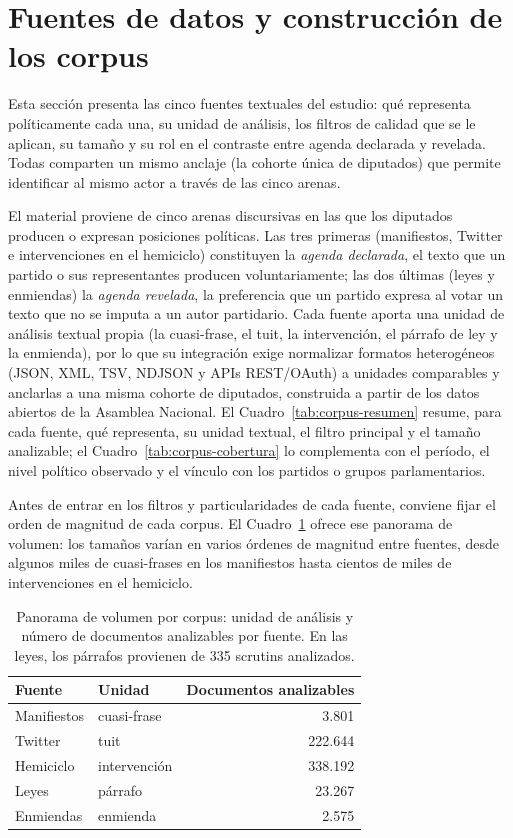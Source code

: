 \section{Fuentes de datos y construcción de los corpus}
\label{sec:fuentes}

Esta sección presenta las cinco fuentes textuales del estudio: qué representa
políticamente cada una, su unidad de análisis, los filtros de calidad que se le
aplican, su tamaño y su rol en el contraste entre agenda declarada y revelada.
Todas comparten un mismo anclaje (la cohorte única de diputados) que permite
identificar al mismo actor a través de las cinco arenas.

El material proviene de cinco arenas discursivas en las que los diputados
producen o expresan posiciones políticas. Las tres primeras (manifiestos,
Twitter e intervenciones en el hemiciclo) constituyen la \emph{agenda
declarada}, el texto que un partido o sus representantes producen voluntariamente;
las dos últimas (leyes y enmiendas) la \emph{agenda revelada}, la preferencia
que un partido expresa al votar un texto que no se imputa a un autor partidario.
Cada fuente aporta una unidad de análisis textual propia (la cuasi-frase, el
tuit, la intervención, el párrafo de ley y la enmienda), por lo que su
integración exige normalizar formatos heterogéneos (JSON, XML, TSV, NDJSON y
APIs REST/OAuth) a unidades comparables y anclarlas a una misma cohorte de
diputados, construida a partir de los datos abiertos de la Asamblea Nacional. El
Cuadro~\ref{tab:corpus-resumen} resume, para cada fuente, qué representa, su
unidad textual, el filtro principal y el tamaño analizable; el
Cuadro~\ref{tab:corpus-cobertura} lo complementa con el período, el nivel
político observado y el vínculo con los partidos o grupos parlamentarios.

Antes de entrar en los filtros y particularidades de cada fuente, conviene fijar
el orden de magnitud de cada corpus. El Cuadro~\ref{tab:corpus-volumen} ofrece ese
panorama de volumen: los tamaños varían en varios órdenes de magnitud entre
fuentes, desde algunos miles de cuasi-frases en los manifiestos hasta cientos de
miles de intervenciones en el hemiciclo.

\begin{table}[H]
\centering
\caption{Panorama de volumen por corpus: unidad de análisis y número de documentos
analizables por fuente. En las leyes, los párrafos provienen de 335 scrutins
analizados.}
\label{tab:corpus-volumen}
\small
\begin{tabular}{@{}llr@{}}
\toprule
\textbf{Fuente} & \textbf{Unidad} & \textbf{Documentos analizables} \\
\midrule
Manifiestos & cuasi-frase & 3.801 \\
Twitter & tuit & 222.644 \\
Hemiciclo & intervención & 338.192 \\
Leyes & párrafo & 23.267 \\
Enmiendas & enmienda & 2.575 \\
\bottomrule
\end{tabular}
\end{table}

